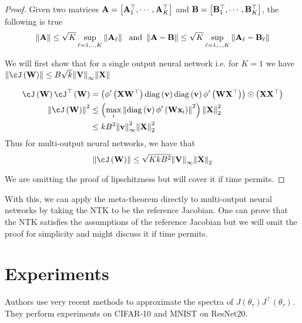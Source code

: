 \documentclass[a4paper]{article}
\begin{document}
\begin{proof}
  Given two matrices ${\mathbf{A}} =
  \left[{{\mathbf{A}}_1^\top,\cdots,{\mathbf{A}}_K^\top}\right]$ and  ${\mathbf{B}} =
  \left[{{\mathbf{B}}_1^\top,\cdots,{\mathbf{B}}_K^\top}\right]$, the following is true
  \[\mathrm{\left\lVert{\mathbf{A}}\right\rVert}\le\sqrt{K}\sup_{\ell=1,..,K}\mathrm{\left\lVert{\mathbf{A}}_\ell\right\rVert}\text{
    \enskip and\enskip}\mathrm{\left\lVert{\mathbf{A}} -
    {\mathbf{B}}\right\rVert}\le\sqrt{K}\sup_{\ell=1,..,K}\mathrm{\left\lVert{\mathbf{A}}_\ell-{\mathbf{B}}_\ell\right\rVert}\]

We will first show that for a single output neural network i.e. for
$K=1$ we have $\norm{\cJ\br{\vec{W}}}\le
B\sqrt{k}\norm{\vec{V}}_\infty\norm{\vec{X}}$

\begin{align*}
  \cJ\br{\vec{W}}\cJ^\top\br{\vec{W}} &=
  \br{\phi^\prime\br{\vec{X}\vec{W}^\top}\diag{\vec{v}}\diag{\vec{v}}\phi^\prime\br{\vec{W}\vec{X}^\top}}\odot\br{\vec{X}\vec{X}^\top}\\
\norm{ \cJ\br{\vec{W}}}^2 &\le
                            \br{\max_i\norm{\diag{\vec{v}}\phi^\prime\br{\vec{W}\vec{x}_i}}^2}\norm{\vec{X}}_2^2\\
                                      &\le kB^2\norm{\vec{v}}_\infty^2\norm{\vec{X}}_2^2
\end{align*}
Thus for multi-output neural networks, we have that
\[\norm{ \cJ\br{\vec{W}}}\le
  \sqrt{KkB^2}\norm{\vec{V}}_\infty\norm{\vec{X}}_2 \]

We are omitting the proof of lipschitzness but will cover it if time permits.
\end{proof}
With this, we can apply the meta-theorem directly to multi-output
neural networks by taking the NTK to be the reference Jacobian. One
can prove that the NTK satisfies the assumptions of the reference
Jacobian but we will omit the proof for simplicity and might discuss
it if time permits.







\section{Experiments}

Authors use very recent methods to approximate the spectra of $J(\theta_\tau)J^\top(\theta_\tau)$. They perform experiments on CIFAR-10 and MNIST on ResNet20.
\end{document}
